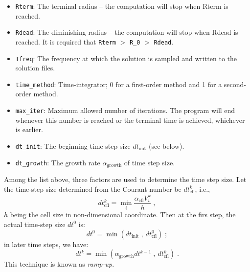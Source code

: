 \documentclass{amsproc}
\theoremstyle{definition}
\theoremstyle{remark}
\numberwithin{equation}{section}
\numberwithin{figure}{section}
\begin{document}
\begin{itemize}
\item \texttt{Rterm}: The terminal radius -- the computation will stop when Rterm is reached.
\item \texttt{Rdead}: The diminishing radius -- the computation will stop when Rdead is reached. It is required that \texttt{Rterm} $>$ \texttt{R\_0} $>$ \texttt{Rdead}.
\item \texttt{Tfreq}: The frequency at which the solution is sampled and written to the solution files.
\item \texttt{time\_method}: Time-integrator; 0 for a first-order method and 1 for a second-order method.
\item \texttt{max\_iter}: Maximum allowed number of iterations. The program will end whenever this number is reached or the terminal time is achieved, whichever is earlier.
\item \texttt{dt\_init}: The beginning time step size $dt_{\textrm{init}}$ (see below).
\item \texttt{dt\_growth}: The growth rate $\alpha_{\textrm{growth}}$ of time step size.
\end{itemize}
Among the list above, three factors are used to determine the time step size.
Let the time-step size determined from the Courant number be $dt^k_{\textrm{cfl}}$, i.e., 
\begin{displaymath}
dt^k_{\textrm{cfl}} = \min_i\frac{\alpha_{\textrm{cfl}}V^k_i}{h}\;,
\end{displaymath}
$h$ being the cell size in non-dimensional coordinate.
Then at the firs step, the actual time-step size $dt^0$ is:
\begin{displaymath}
dt^0 = \min(dt_{\textrm{init}}\;,\ dt^0_{\textrm{cfl}})\;;
\end{displaymath}
in later time steps, we have:
\begin{displaymath}
dt^k = \min(\alpha_{\textrm{growth}}dt^{k-1}\;,\ dt^k_{\textrm{cfl}})\;.
\end{displaymath}
This technique is known as {\it ramp-up}.
\end{document}
